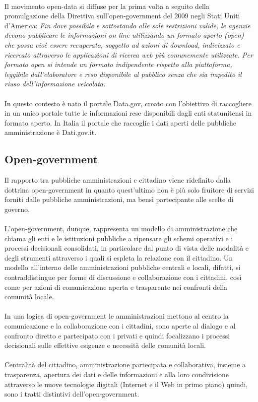 \documentclass{article}
\theoremstyle{plain}
\theoremstyle{definition}
\begin{document}
\phantom
\\
Il movimento open-data si diffuse per la prima volta a seguito della promulgazione della Direttiva sull'open-government del 2009 negli Stati Uniti d'America:
\textit{Fin dove possibile e sottostando alle sole restrizioni valide, le agenzie devono pubblicare le informazioni on line utilizzando un formato aperto (open) che possa cioè essere recuperato, soggetto ad azioni di download, indicizzato e ricercato attraverso le applicazioni di ricerca web più comunemente utilizzate. Per formato open si intende un formato indipendente rispetto alla piattaforma, leggibile dall'elaboratore e reso disponibile al pubblico senza che sia impedito il riuso dell'informazione veicolata.}
\\
\\
In questo contesto è nato il portale Data.gov, creato con l'obiettivo di raccogliere in un unico portale tutte le informazioni rese disponibili dagli enti statunitensi in formato aperto. In Italia il portale che raccoglie i dati aperti delle pubbliche amministrazione è Dati.gov.it.

\subsection{Open-government} 
Il rapporto tra pubbliche amministrazioni e cittadino viene ridefinito dalla dottrina open-government in quanto quest'ultimo non è più solo fruitore di servizi forniti dalle pubbliche amministrazioni, ma bensì partecipante alle scelte di governo.
\\
\\
L'open-government, dunque, rappresenta un modello di amministrazione che chiama gli enti e le istituzioni pubbliche a ripensare gli schemi operativi e i processi decisionali consolidati, in particolare dal punto di vista delle modalità e degli strumenti attraverso i quali si espleta la relazione con il cittadino. Un modello  all'interno delle amministrazioni pubbliche centrali e locali, difatti, si contraddistingue per forme di discussione e collaborazione con i cittadini, così come per azioni di comunicazione aperta e trasparente nei confronti della comunità locale. 
\\
\\
In una logica di open-government le amministrazioni mettono al centro la comunicazione e la collaborazione con i cittadini, sono aperte al dialogo e al confronto diretto e partecipato con i privati e quindi focalizzano i processi decisionali sulle effettive esigenze e necessità delle comunità locali. 
\\
\\
Centralità del cittadino, amministrazione partecipata e collaborativa, insieme a trasparenza, apertura dei dati e delle informazioni e alla loro condivisione attraverso le nuove tecnologie digitali (Internet e il Web in primo piano) quindi, sono i tratti distintivi dell'open-government. 
 
\end{document}
